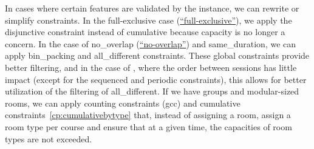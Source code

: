 
%
In cases where certain features are validated by the instance, we can rewrite or simplify constraints. 
%
%
%
In the full-exclusive case (\hyperref[featmodel:exclusivesession]{``full-exclusive''}), we apply the disjunctive constraint instead of cumulative because capacity is no longer a concern. 
%
In the case of no\_overlap (\hyperref[feat:nooverlap]{``no-overlap''}) and same\_duration, we can apply bin\_packing and all\_different constraints. These global constraints provide better filtering, and in the case of \UTP{}, where the order between sessions has little impact (except for the sequenced and periodic constraints), this allows for better utilization of the filtering of all\_different. 
%
%
If we have groups and modular-sized rooms, we can apply counting constraints (gcc) and cumulative constraints~\ref{cp:cumulativebytype} that, instead of assigning a room, assign a room type per course and ensure that at a given time, the capacities of room types are not exceeded.
%
